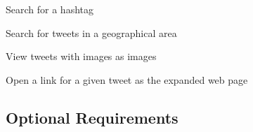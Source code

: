 \begin{Requirements}

\item Search for a hashtag
\item Search for tweets in a geographical area

\item View tweets with images as images
\item Open a link for a given tweet as the expanded web page

\end{Requirements}

\subsection{Optional Requirements}
